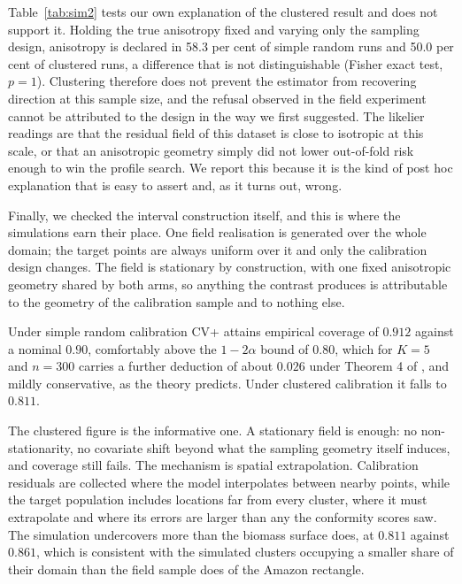\documentclass[preprint,12pt,authoryear]{elsarticle}
\begin{document}
\begin{table}[!ht]
\centering
\caption{Simulation S1. Proportion of runs in which anisotropy is declared, by
true ratio and signal-to-noise ratio, under simple random sampling with 500
points. A true ratio of 1 is an isotropic field.}
\label{tab:sim1}
\small

\end{table}

Table~\ref{tab:sim2} tests our own explanation of the clustered result and does
not support it. Holding the true anisotropy fixed and varying only the sampling
design, anisotropy is declared in 58.3 per cent of simple random runs and 50.0
per cent of clustered runs, a difference that is not distinguishable
(Fisher exact test, $p = 1$). Clustering therefore does not prevent the
estimator from recovering direction at this sample size, and the refusal
observed in the field experiment cannot be attributed to the design in the way
we first suggested. The likelier readings are that the residual field of this
dataset is close to isotropic at this scale, or that an anisotropic geometry
simply did not lower out-of-fold risk enough to win the profile search. We
report this because it is the kind of post hoc explanation that is easy to
assert and, as it turns out, wrong.

\begin{table}[!ht]
\centering
\caption{Simulation S2. Proportion of runs declaring anisotropy when the true
geometry is held fixed and only the sampling design changes.}
\label{tab:sim2}
\small

\end{table}

Finally, we checked the interval construction itself, and this is where the
simulations earn their place. One field realisation is generated over the whole
domain; the target points are always uniform over it and only the calibration
design changes. The field is stationary by construction, with one fixed anisotropic geometry
shared by both arms, so anything the contrast produces is attributable to the
geometry of the calibration sample and to nothing else.

Under simple random calibration CV+ attains empirical coverage of $0.912$
against a nominal $0.90$, comfortably above the $1-2\alpha$ bound of $0.80$,
which for $K=5$ and $n=300$ carries a further deduction of about $0.026$ under
Theorem 4 of \citet{barber2021}, and mildly conservative, as the theory
predicts. Under clustered calibration it falls to $0.811$.

The clustered figure is the informative one. A stationary field is enough: no
non-stationarity, no covariate shift beyond what the sampling geometry itself
induces, and coverage still fails. The mechanism is spatial extrapolation. Calibration
residuals are collected where the model interpolates between nearby points,
while the target population includes locations far from every cluster, where it
must extrapolate and where its errors are larger than any the conformity scores
saw. The simulation undercovers more than the biomass surface does, at $0.811$
against $0.861$, which is consistent with the simulated clusters occupying a
smaller share of their domain than the field sample does of the Amazon
rectangle.
\end{document}

